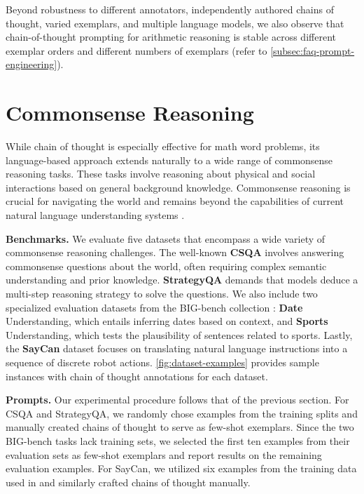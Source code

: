 Beyond robustness to different annotators, independently authored chains of thought, varied exemplars, and multiple language models, we also observe that chain-of-thought prompting for arithmetic reasoning is stable across different exemplar orders and different numbers of exemplars (refer to \cref{subsec:faq-prompt-engineering}).

\section{Commonsense Reasoning}\label{sec:commonsense-reasoning}

While chain of thought is especially effective for math word problems, its language-based approach extends naturally to a wide range of commonsense reasoning tasks. These tasks involve reasoning about physical and social interactions based on general background knowledge. Commonsense reasoning is crucial for navigating the world and remains beyond the capabilities of current natural language understanding systems \citep{talmor2022commonsenseqa}.

\textbf{Benchmarks.}  
We evaluate five datasets that encompass a wide variety of commonsense reasoning challenges. The well-known \textbf{CSQA} \citep{talmor-etal-2019-commonsenseqa} involves answering commonsense questions about the world, often requiring complex semantic understanding and prior knowledge.  
\textbf{StrategyQA} \citep{geva-etal-2021-aristotle} demands that models deduce a multi-step reasoning strategy to solve the questions. We also include two specialized evaluation datasets from the BIG-bench collection \citep{bigbench}: \textbf{Date} Understanding, which entails inferring dates based on context, and \textbf{Sports} Understanding, which tests the plausibility of sentences related to sports. Lastly, the \textbf{SayCan} dataset \citep{ahn2022can} focuses on translating natural language instructions into a sequence of discrete robot actions.  
\cref{fig:dataset-examples} provides sample instances with chain of thought annotations for each dataset.

\textbf{Prompts.}  
Our experimental procedure follows that of the previous section. For CSQA and StrategyQA, we randomly chose examples from the training splits and manually created chains of thought to serve as few-shot exemplars. Since the two BIG-bench tasks lack training sets, we selected the first ten examples from their evaluation sets as few-shot exemplars and report results on the remaining evaluation examples. For SayCan, we utilized six examples from the training data used in \citet{ahn2022can} and similarly crafted chains of thought manually.

